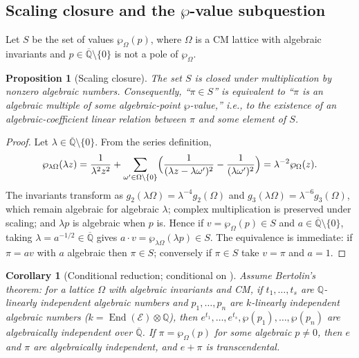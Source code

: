 \documentclass[11pt]{amsart}
\newtheorem{proposition}[theorem]{Proposition}
\newtheorem{corollary}[theorem]{Corollary}
\theoremstyle{definition}
\theoremstyle{remark}
\numberwithin{equation}{section}
\newcommand{\Q}{\mathbb{Q}}
\newcommand{\Qbar}{\overline{\mathbb{Q}}}
\newcommand{\ee}{e}
\begin{document}
\subsection{Scaling closure and the \texorpdfstring{$\wp$}{wp}-value subquestion}

Let $S$ be the set of values $\wp_\Omega(p)$, where $\Omega$ is a CM lattice with algebraic invariants and $p\in\Qbar\setminus\{0\}$ is not a pole of $\wp_\Omega$.

\begin{proposition}[Scaling closure]\label{prop:scaling}
The set $S$ is closed under multiplication by nonzero algebraic numbers. Consequently, ``$\pi\in S$'' is equivalent to ``$\pi$ is an algebraic multiple of some algebraic-point $\wp$-value,'' i.e., to the existence of an algebraic-coefficient linear relation between $\pi$ and some element of $S$.
\end{proposition}

\begin{proof}
Let $\lambda\in\Qbar\setminus\{0\}$. From the series definition,
\[
\wp_{\lambda\Omega}(\lambda z)=\frac1{\lambda^2z^2}+\sum_{\omega'\in\Omega\setminus\{0\}}\Bigl(\frac1{(\lambda z-\lambda\omega')^2}-\frac1{(\lambda\omega')^2}\Bigr)=\lambda^{-2}\wp_\Omega(z).
\]
The invariants transform as $g_2(\lambda\Omega)=\lambda^{-4}g_2(\Omega)$ and $g_3(\lambda\Omega)=\lambda^{-6}g_3(\Omega)$, which remain algebraic for algebraic $\lambda$; complex multiplication is preserved under scaling; and $\lambda p$ is algebraic when $p$ is. Hence if $v=\wp_\Omega(p)\in S$ and $a\in\Qbar\setminus\{0\}$, taking $\lambda=a^{-1/2}\in\Qbar$ gives $a\cdot v=\wp_{\lambda\Omega}(\lambda p)\in S$. The equivalence is immediate: if $\pi=a v$ with $a$ algebraic then $\pi\in S$; conversely if $\pi\in S$ take $v=\pi$ and $a=1$.
\end{proof}

\begin{corollary}[Conditional reduction; conditional on {\cite{Bertolin2026}}]\label{cor:bertolin}
Assume Bertolin's theorem: for a lattice $\Omega$ with algebraic invariants and CM, if $t_1,\dots,t_s$ are $\Q$-linearly independent algebraic numbers and $p_1,\dots,p_n$ are $k$-linearly independent algebraic numbers ($k=\operatorname{End}(\mathcal E)\otimes\Q$), then $\ee^{t_1},\dots,\ee^{t_s},\wp(p_1),\dots,\wp(p_n)$ are algebraically independent over $\Qbar$. If $\pi=\wp_\Omega(p)$ for some algebraic $p\ne0$, then $\ee$ and $\pi$ are algebraically independent, and $e+\pi$ is transcendental.
\end{corollary}
\end{document}
